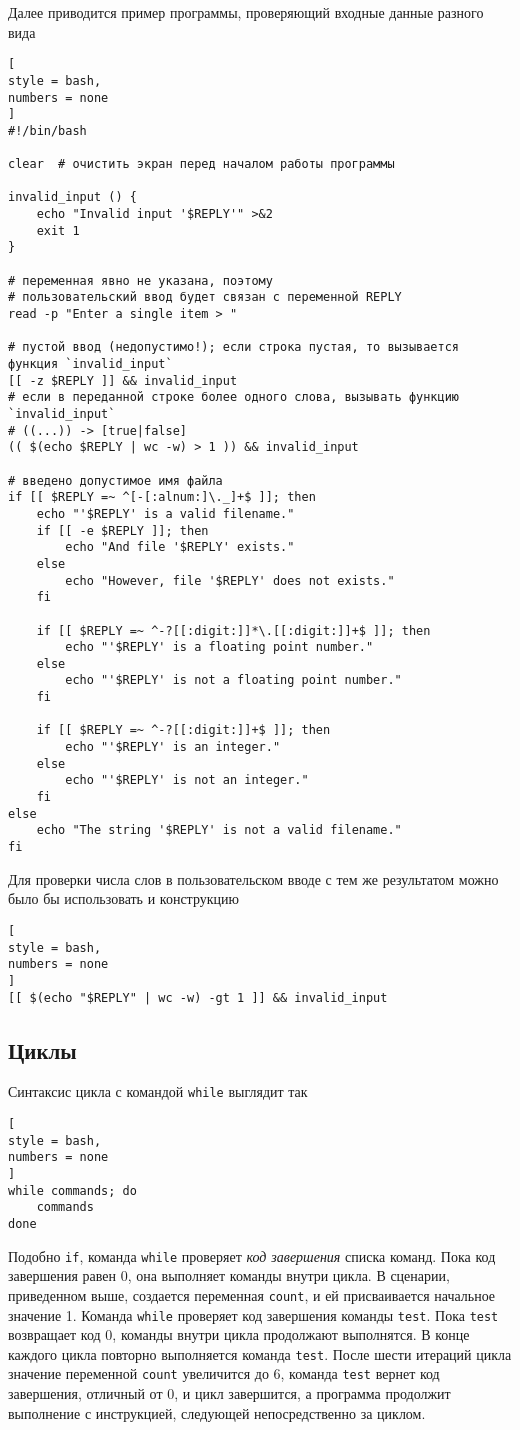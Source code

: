 \documentclass[%
	11pt,
	a4paper,
	utf8,
		]{article}
\begin{document}
Далее приводится пример программы, проверяющий входные данные разного вида
\begin{lstlisting}[
style = bash,
numbers = none
]
#!/bin/bash

clear  # очистить экран перед началом работы программы

invalid_input () {
    echo "Invalid input '$REPLY'" >&2
    exit 1
}

# переменная явно не указана, поэтому
# пользовательский ввод будет связан с переменной REPLY
read -p "Enter a single item > "

# пустой ввод (недопустимо!); если строка пустая, то вызывается функция `invalid_input`
[[ -z $REPLY ]] && invalid_input
# если в переданной строке более одного слова, вызывать функцию `invalid_input`
# ((...)) -> [true|false]
(( $(echo $REPLY | wc -w) > 1 )) && invalid_input

# введено допустимое имя файла
if [[ $REPLY =~ ^[-[:alnum:]\._]+$ ]]; then
    echo "'$REPLY' is a valid filename."
    if [[ -e $REPLY ]]; then
        echo "And file '$REPLY' exists."
    else
        echo "However, file '$REPLY' does not exists."
    fi

    if [[ $REPLY =~ ^-?[[:digit:]]*\.[[:digit:]]+$ ]]; then
        echo "'$REPLY' is a floating point number."
    else
        echo "'$REPLY' is not a floating point number."
    fi

    if [[ $REPLY =~ ^-?[[:digit:]]+$ ]]; then
        echo "'$REPLY' is an integer."
    else
        echo "'$REPLY' is not an integer."
    fi
else
    echo "The string '$REPLY' is not a valid filename."
fi
\end{lstlisting}

Для проверки числа слов в пользовательском вводе с тем же результатом можно было бы использовать и конструкцию
\begin{lstlisting}[
style = bash,
numbers = none
]
[[ $(echo "$REPLY" | wc -w) -gt 1 ]] && invalid_input
\end{lstlisting}

\subsection{Циклы}

Синтаксис цикла с командой \texttt{while} выглядит так
\begin{lstlisting}[
style = bash,
numbers = none
]
while commands; do
    commands
done
\end{lstlisting}

Подобно \texttt{if}, команда \texttt{while} проверяет \emph{код завершения} списка команд. Пока код завершения равен 0, она выполняет команды внутри цикла. В сценарии, приведенном выше, создается переменная \texttt{count}, и ей присваивается начальное значение 1. Команда \texttt{while} проверяет код завершения команды \texttt{test}. Пока \texttt{test} возвращает код 0, команды внутри цикла продолжают выполнятся. В конце каждого цикла повторно выполняется команда \texttt{test}. После шести итераций цикла значение переменной \texttt{count} увеличится до 6, команда \texttt{test} вернет код завершения, отличный от 0, и цикл завершится, а программа продолжит выполнение с инструкцией, следующей непосредственно за циклом.
\end{document}

